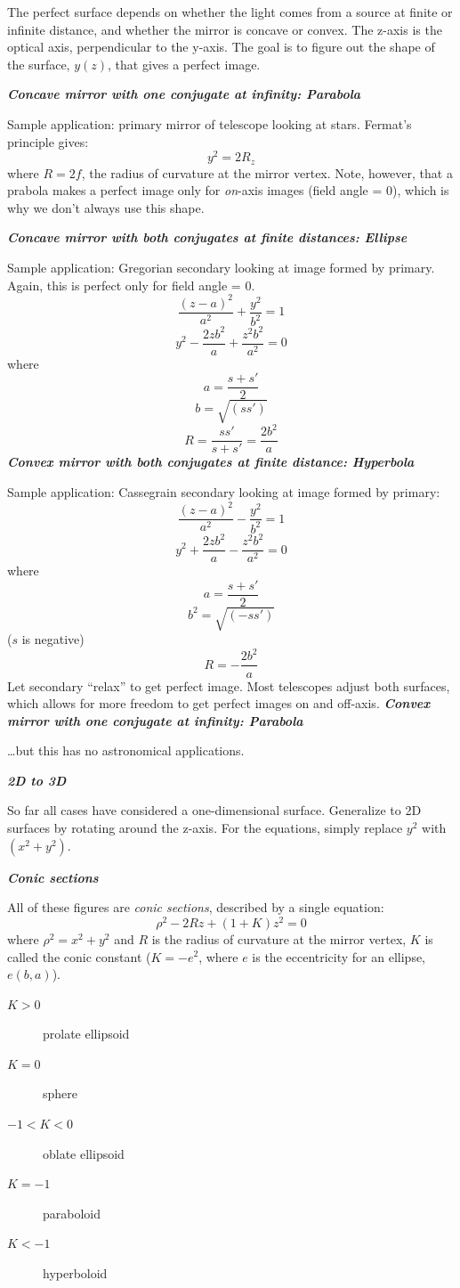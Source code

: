 \documentclass[12pt]{article}
\begin{document}
The perfect surface depends on whether the
light comes from a source at finite or infinite distance, and whether
the mirror is concave or convex.
The z-axis is the optical axis, perpendicular to the y-axis.
The goal is to figure out the shape of the surface, $y(z)$, that gives
a perfect image.

\textbf{\emph{%
Concave mirror with one conjugate at infinity: Parabola}}
\par Sample application: primary mirror of telescope looking at stars.
Fermat's principle gives:{$$
    y^{2} = 2R_{z}
$$}where $R = 2f$, the radius of curvature at the mirror vertex.
Note, however, that a prabola makes a perfect image
only for \emph{on}-axis images (field angle = 0), which is why we don't always
use this shape.

\textbf{\emph{%
Concave mirror with both conjugates at finite distances: Ellipse}}
\par Sample application: Gregorian secondary looking at image formed by primary.
Again, this is perfect only for field angle = 0.{$$
    \frac{(z-a)^2}{a^2} + \frac{y^2}{b^2} = 1 $$ $$
    y^{2} - \frac{2zb^{2}}{a} + \frac{z^{2}b^{2}}{a^{2}} = 0
$$}where{$$
    a = \frac{s+s'}{2} $$ $$
    b = \sqrt{(ss')} $$ $$
    R = \frac{ss'}{s+s'} = \frac{2b^2}{a}
$$}
\textbf{\emph{%
Convex mirror with both conjugates at finite distance: Hyperbola}}
\par Sample application: Cassegrain secondary looking at
image formed by primary:{$$
    \frac{(z-a)^2}{a^2} - \frac{y^2}{b^2} = 1 $$ $$
    y^2 + \frac{2zb^2}{a} - \frac{z^2b^2}{a^2} = 0
$$}where{$$
    a = \frac{s+s'}{2} $$ $$
    b^2 = \sqrt{(-ss')}
$$}($s$ is negative){$$
    R = -\frac{2b^2}{a}
$$}Let secondary ``relax'' to get perfect image. Most telescopes adjust
both surfaces, which allows for more freedom to get perfect images on
and off-axis.
\textbf{\emph{%
Convex mirror with one conjugate at infinity: Parabola}}
\par\ldots but this has no astronomical applications.

\textbf{\emph{2D to 3D}}
\par So far all cases have considered a one-dimensional surface.
Generalize to 2D surfaces by rotating around the z-axis.
For the equations, simply replace $y^2$ with $(x^2 + y^2)$.

\textbf{\emph{Conic sections}}
\par All of these figures are
\emph{conic sections}, described by a single equation:{$$
    \rho^2 - 2Rz + (1+K)z^2 = 0
$$}where $ \rho^2 = x^2 + y^2 $
and $R$ is the radius of curvature at the mirror vertex,
$K$ is called the conic constant ($K = -e^2$, where $e$ is the eccentricity for
an ellipse, $e(b, a)$).
\begin{description}
    \item [$K > 0$] prolate ellipsoid
    \item [$K = 0$] sphere
    \item [$-1 < K < 0$] oblate ellipsoid
    \item [$K = - 1$] paraboloid
    \item [$K < - 1$] hyperboloid
\end{description}
\end{document}
